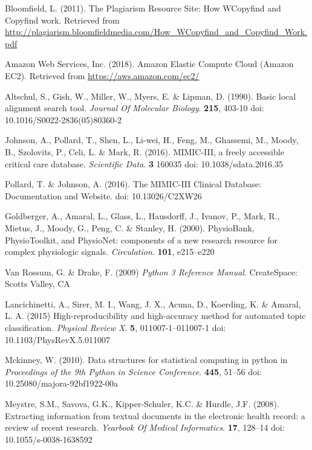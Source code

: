 \documentclass[runningheads,a4paper]{llncs}
\begin{document}
\begin{thebibliography}{50}
Bloomfield, L. (2011). The Plagiarism Resource Site: How WCopyfind and Copyfind work. Retrieved from \url{http://plagiarism.bloomfieldmedia.com/How_WCopyfind_and_Copyfind_Work.pdf}

Amazon Web Services, Inc. (2018). Amazon Elastic Compute Cloud (Amazon EC2). Retrieved from \url{https://aws.amazon.com/ec2/}

Altschul, S., Gish, W., Miller, W., Myers, E. \& Lipman, D. (1990). Basic local alignment search tool.  {\em Journal Of Molecular Biology}. \textbf{215}, 403-10 doi: 10.1016/S0022-2836(05)80360-2

Johnson, A., Pollard, T., Shen, L., Li-wei, H., Feng, M., Ghassemi, M., Moody, B., Szolovits, P., Celi, L. \& Mark, R. (2016). MIMIC-III, a freely accessible critical care database.  {\em Scientific Data}. \textbf{3} 160035 doi: 10.1038/sdata.2016.35

Pollard, T. \& Johnson, A. (2016). The MIMIC-III Clinical Database: Documentation and Website. doi: 10.13026/C2XW26

Goldberger, A., Amaral, L., Glass, L., Hausdorff, J., Ivanov, P., Mark, R., Mietus, J., Moody, G., Peng, C. \& Stanley, H. (2000). PhysioBank, PhysioToolkit, and PhysioNet: components of a new research resource for complex physiologic signals. {\em Circulation}. \textbf{101}, e215--e220

Van Rossum, G. \& Drake, F. (2009) {\em Python 3 Reference Manual}. CreateSpace: Scotts Valley, CA

Lancichinetti, A., Sirer, M. I., Wang, J. X., Acuna, D., Koerding, K. \& Amaral, L. A. (2015) High-reproducibility and high-accuracy method for automated topic classification. {\em Physical Review X}. \textbf{5}, 011007-1--011007-1 doi: 10.1103/PhysRevX.5.011007

Mckinney, W. (2010). Data structures for statistical computing in python in {\em Proceedings of the 9th Python in Science Conference}. \textbf{445}, 51--56 doi: 10.25080/majora-92bf1922-00a

Meystre, S.M., Savova, G.K., Kipper-Schuler, K.C. \& Hurdle, J.F.  (2008). Extracting information from textual documents in the electronic health record: a review of recent research.  {\em Yearbook Of Medical Informatics}. \textbf{17}, 128--14  doi: 10.1055/s-0038-1638592


\end{thebibliography}
\end{document}
